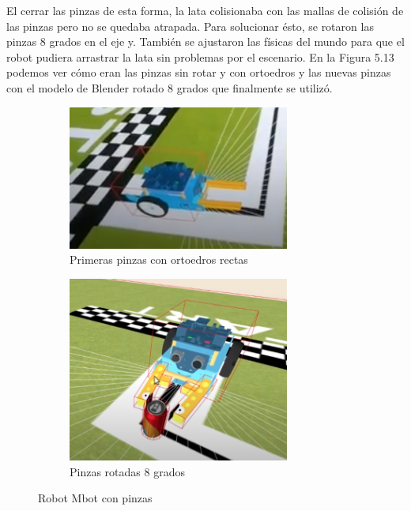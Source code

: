 El cerrar las pinzas de esta forma,  la lata colisionaba con las mallas de colisión de las pinzas pero no se quedaba atrapada. Para solucionar ésto, se rotaron las pinzas 8 grados en el eje y. También se ajustaron las físicas del mundo para que el robot pudiera arrastrar la lata sin problemas por el escenario. En la Figura 5.13 podemos ver cómo eran las pinzas sin rotar y con ortoedros y las nuevas pinzas con el modelo de Blender rotado 8 grados que finalmente se utilizó.


\begin{figure}[H]
  \begin{subfigure}[b]{0.5\textwidth}
  \centering
    \includegraphics[width=0.8\textwidth, height=0.5\textwidth]{chapters/images/pinzarecta.png}
    \caption{Primeras pinzas con ortoedros rectas}
    \label{fig:f1}
  \end{subfigure}
  \hfill
  \begin{subfigure}[b]{0.5\textwidth}
  \centering
    \includegraphics[width=0.8\textwidth, height=0.5\textwidth]{chapters/images/pinzaok.png}
	\caption{Pinzas rotadas 8 grados}    
    \label{fig:f2}
 
  \end{subfigure}
  \caption{Robot Mbot con pinzas}
\end{figure}

